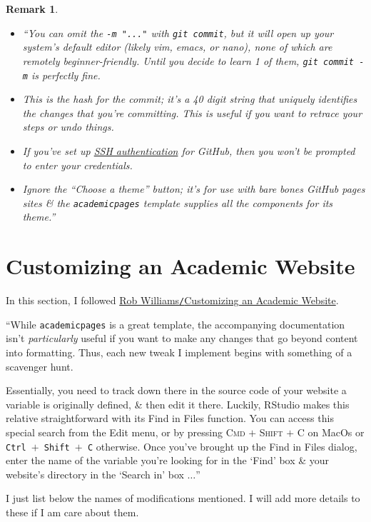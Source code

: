\documentclass{article}
\numberwithin{equation}{section}
\newtheorem{remark}{Remark}[section]
\begin{document}
\begin{remark}
	\begin{itemize}
		\item ``You can omit the \verb|-m "..."| with \verb|git commit|, but it will open up your system's default editor (likely vim, emacs, or nano), none of which are remotely beginner-friendly. Until you decide to learn 1 of them, \verb|git commit -m| is perfectly fine.
		\item This is the \emph{hash} for the commit; it's a 40 digit string that uniquely identifies the changes that you're committing. This is useful if you want to retrace your steps or undo things.
		\item If you've set up \href{https://help.github.com/en/github/authenticating-to-github/connecting-to-github-with-ssh}{SSH authentication} for GitHub, then you won't be prompted to enter your credentials.
		\item Ignore the ``Choose a theme'' button; it's for use with bare bones GitHub pages sites \& the \texttt{academicpages} template supplies all the components for its theme.''
	\end{itemize}
\end{remark}

\section{Customizing an Academic Website}
In this section, I followed \href{https://jayrobwilliams.com/posts/2020/07/customizing-website/}{Rob Williams\texttt{/}Customizing an Academic Website}.

``While \texttt{academicpages} is a great template, the accompanying documentation isn't \textit{particularly} useful if you want to make any changes that go beyond content into formatting. Thus, each new tweak I implement begins with something of a scavenger hunt.

Essentially, you need to track down there in the source code of your website a variable is originally defined, \& then edit it there. Luckily, RStudio makes this relative straightforward with its Find in Files function. You can access this special search from the Edit menu, or by pressing \textsc{Cmd $+$ Shift $+$ C} on MacOs or \texttt{Ctrl $+$ Shift $+$ C} otherwise. Once you've brought up the Find in Files dialog, enter the name of the variable you're looking for in the `Find' box \& your website's directory in the `Search in' box $\ldots$''

I just list below the names of modifications mentioned. I will add more details to these if I am care about them.
\end{document}
